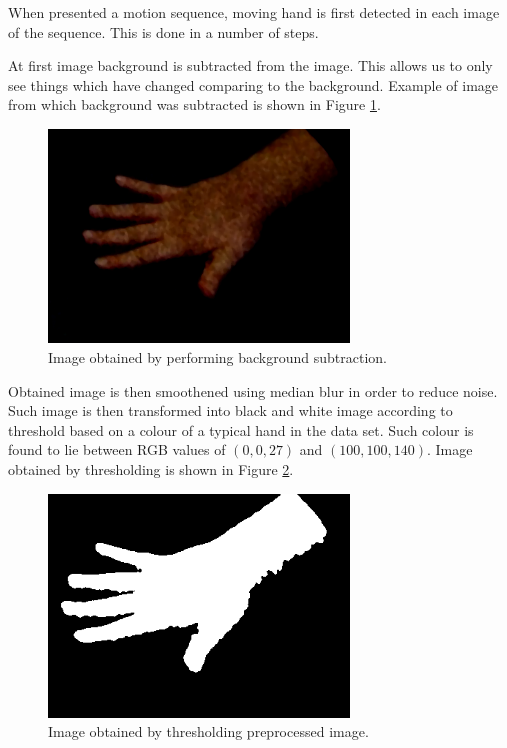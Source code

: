 When presented a motion sequence, moving hand is first detected in each image of the sequence. This is done in a number of steps.

At first image background is subtracted from the image. This allows us to only see things which have changed comparing to the background. Example of image from which background was subtracted is shown in Figure \ref{fig:bgsub}.

\begin{figure}
\begin{center}
\includegraphics[width=80mm]{bgsub.png}
\caption{Image obtained by performing background subtraction.}
\label{fig:bgsub}
\end{center}
\end{figure}


Obtained image is then smoothened using median blur in order to reduce noise. Such image is then transformed into black and white image according to threshold based on a colour of a typical hand in the data set. Such colour is found to lie between RGB values of $(0, 0, 27)$ and $(100, 100, 140)$. Image obtained by thresholding is shown in Figure \ref{fig:bw}.

\begin{figure}
\begin{center}
\includegraphics[width=80mm]{bw.png}
\caption{Image obtained by thresholding preprocessed image.}
\label{fig:bw}
\end{center}
\end{figure}


